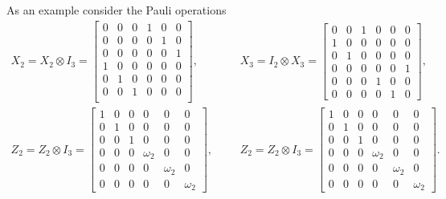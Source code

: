 As an example consider the Pauli operations
\begin{align*}
X_2 = X_2 \otimes I_3 = \begin{bmatrix}
0 & 0 & 0 & 1 & 0 & 0 \\
0 & 0 & 0 & 0 & 1 & 0 \\
0 & 0 & 0 & 0 & 0 & 1 \\
1 & 0 & 0 & 0 & 0 & 0 \\
0 & 1 & 0 & 0 & 0 & 0 \\
0 & 0 & 1 & 0 & 0 & 0 \\
\end{bmatrix},
&&&
X_3 = I_2 \otimes X_3 = \begin{bmatrix}
0 & 0 & 1 & 0 & 0 & 0 \\
1 & 0 & 0 & 0 & 0 & 0 \\
0 & 1 & 0 & 0 & 0 & 0 \\
0 & 0 & 0 & 0 & 0 & 1 \\
0 & 0 & 0 & 1 & 0 & 0 \\
0 & 0 & 0 & 0 & 1 & 0
\end{bmatrix},
\\
Z_2 = Z_2 \otimes I_3 = \begin{bmatrix}
1 & 0 & 0 & 0 & 0 & 0 \\
0 & 1 & 0 & 0 & 0 & 0 \\
0 & 0 & 1 & 0 & 0 & 0 \\
0 & 0 & 0 & \omega_2 & 0 & 0 \\
0 & 0 & 0 & 0 & \omega_2 & 0 \\
0 & 0 & 0 & 0 & 0 & \omega_2
\end{bmatrix},
&&&
Z_2 = Z_2 \otimes I_3 = \begin{bmatrix}
1 & 0 & 0 & 0 & 0 & 0 \\
0 & 1 & 0 & 0 & 0 & 0 \\
0 & 0 & 1 & 0 & 0 & 0 \\
0 & 0 & 0 & \omega_2 & 0 & 0 \\
0 & 0 & 0 & 0 & \omega_2 & 0 \\
0 & 0 & 0 & 0 & 0 & \omega_2
\end{bmatrix}.
\end{align*}

